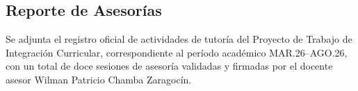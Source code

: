 

\clearpage
\subsection{Reporte de Asesorías}

Se adjunta el registro oficial de actividades de tutoría del Proyecto de Trabajo de Integración Curricular, correspondiente al período académico MAR.26--AGO.26, con un total de doce sesiones de asesoría validadas y firmadas por el docente asesor Wilman Patricio Chamba Zaragocín.


